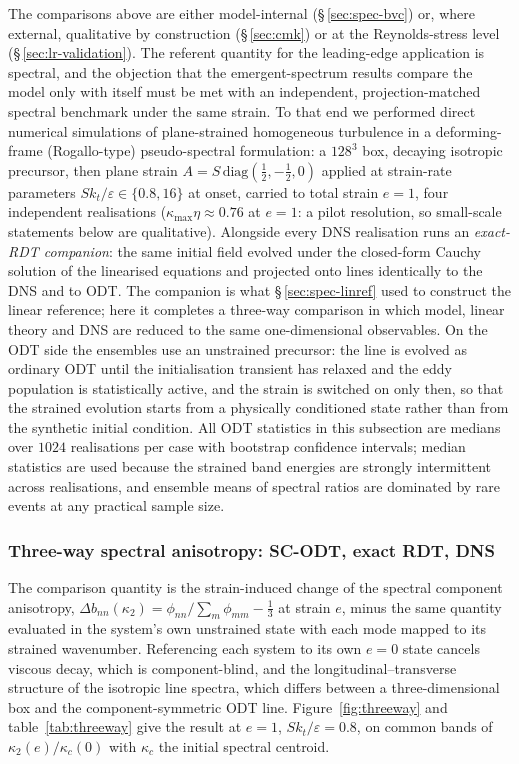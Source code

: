 \documentclass[lineno]{JFM-FLM_Au}
\begin{document}
The comparisons above are either model-internal
(\S\,\ref{sec:spec-bvc}) or, where external, qualitative by construction
(\S\,\ref{sec:cmk}) or at the Reynolds-stress level
(\S\,\ref{sec:lr-validation}). The referent quantity for the
leading-edge application is spectral, and the objection that the
emergent-spectrum results compare the model only with itself must be met
with an independent, projection-matched spectral benchmark under the
same strain. To that end
we performed direct numerical simulations of plane-strained homogeneous
turbulence in a deforming-frame (Rogallo-type) pseudo-spectral formulation:
a $128^3$ box, decaying isotropic precursor, then plane strain
$A=S\,\mathrm{diag}(\tfrac12,-\tfrac12,0)$ applied at strain-rate
parameters $Sk_t/\varepsilon\in\{0.8,16\}$ at onset, carried to total
strain $e=1$, four independent realisations
($\kappa_{\max}\eta\approx0.76$ at $e=1$: a pilot resolution, so
small-scale statements below are qualitative). Alongside every DNS
realisation runs an \emph{exact-RDT companion}: the same initial field
evolved under the closed-form Cauchy solution of the linearised equations
and projected onto lines identically to the DNS and to ODT. The companion
is what \S\,\ref{sec:spec-linref} used to construct the linear reference;
here it completes a three-way comparison in which model, linear theory and
DNS are reduced to the same one-dimensional observables. On the ODT side
the ensembles use an unstrained precursor: the line is evolved as ordinary
ODT until the initialisation transient has relaxed and the eddy population
is statistically active, and the strain is switched on only then, so that
the strained evolution starts from a physically conditioned state rather
than from the synthetic initial condition. All ODT statistics in this
subsection are medians over $1024$ realisations per case with bootstrap
confidence intervals; median statistics are used because the strained band
energies are strongly intermittent across realisations, and ensemble means
of spectral ratios are dominated by rare events at any practical sample
size.

\subsubsection{Three-way spectral anisotropy: SC-ODT, exact RDT,
DNS}\label{sec:threeway}

The comparison quantity is the strain-induced change of the spectral
component anisotropy,
$\Delta b_{nn}(\kappa_2)=\phi_{nn}/\sum_m\phi_{mm}-\tfrac13$ at strain $e$,
minus the same quantity evaluated in the system's own unstrained state with
each mode mapped to its strained wavenumber. Referencing each system to its
own $e=0$ state cancels viscous decay, which is component-blind, and the
longitudinal--transverse structure of the isotropic line spectra, which
differs between a three-dimensional box and the component-symmetric ODT
line. Figure~\ref{fig:threeway} and table~\ref{tab:threeway} give the
result at $e=1$, $Sk_t/\varepsilon=0.8$, on common bands of
$\kappa_2(e)/\kappa_c(0)$ with $\kappa_c$ the initial spectral centroid.
\end{document}
